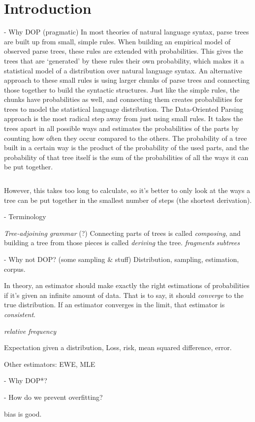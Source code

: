 
\section{Introduction}



- Why DOP (pragmatic)
In most theories of natural language syntax, parse trees are built up from small, simple rules. 
When building an empirical model of observed parse trees, these rules are extended with probabilities. This gives the trees that are `generated' by these rules their own probability, which makes it a statistical model of a distribution over natural language syntax.
An alternative approach to these small rules is using larger chunks of parse trees and connecting those together to build the syntactic structures. 
Just like the simple rules, the chunks have probabilities as well, and connecting them creates probabilities for trees to model the statistical language distribution.
The Data-Oriented Parsing approach is the most radical step away from just using small rules. It takes the trees apart in all possible ways and estimates the probabilities of the parts by counting how often they occur compared to the others. The probability of a tree built in a certain way is the product of the probability of the used parts, and the probability of that tree itself is the sum of the probabilities of all the ways it can be put together. %

$$$$

However, this takes too long to calculate, so it's better to only look at the ways a tree can be put together in the smallest number of steps (the shortest derivation).

- Terminology

\emph{Tree-adjoining grammar} (?)
Connecting parts of trees is called \emph{composing}, and building a tree from those pieces is called \emph{deriving} the tree.
\emph{fragments}
\emph{subtrees}

- Why not DOP? (some sampling \& stuff)
Distribution, sampling, estimation, corpus.

In theory, an estimator should make exactly the right estimations of probabilities if it's given an infinite amount of data. That is to say, it should \emph{converge} to the true distribution. If an estimator converges in the limit, that estimator is \emph{consistent}.

\emph{relative frequency}

Expectation given a distribution, Loss, risk, mean squared difference, error.

Other estimators:
EWE, MLE



- Why DOP*?



- How do we prevent overfitting?

bias is good.